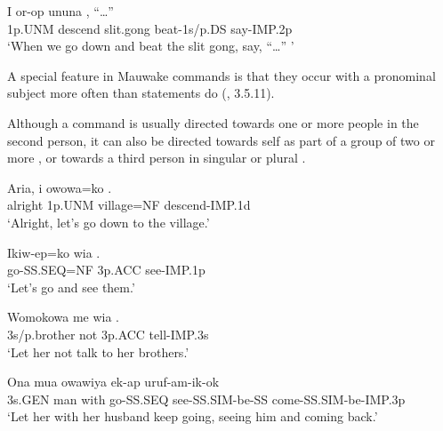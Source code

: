 \ea%
\label{ex:x1083}
\gll I  or-op  ununa    ,  ``{\dots''} \\
1p.UNM  descend  slit.gong  beat-1s/p.DS  say-IMP.2p      \\
\glt `When we go down and beat the slit gong, say, ``{\dots}'' '
\z



A special feature in Mauwake commands is that they occur with a pronominal  subject more often than statements do (, 3.5.11). 

Although a command is usually directed towards one or more people in the second person, it can also be directed towards self as part of a group of two  or more , or towards a third person in singular  or plural . 

\ea%
\label{ex:x1157}
\gll Aria,  i  owowa=ko  . \\
 alright  1p.UNM  village=NF  descend-IMP.1d     \\
\glt `Alright, let's go down to the village.'
\z





\ea%
\label{ex:x1158}
\gll Ikiw-ep=ko  wia  . \\
  go-SS.SEQ=NF  3p.ACC  see-IMP.1p    \\
\glt `Let's go and see them.'
\z





\ea%
\label{ex:x1159}
\gll Womokowa  me  wia  . \\
 3s/p.brother  not  3p.ACC  tell-IMP.3s     \\
\glt `Let her not talk to her brothers.'
\z





\ea%
\label{ex:x1160}
\gll Ona  mua  owawiya  ek-ap  uruf-am-ik-ok  \\
3s.GEN  man  with  go-SS.SEQ  see-SS.SIM-be-SS  come-SS.SIM-be-IMP.3p    \\
\glt `Let her with her husband keep going, seeing him and coming back.'
\z









